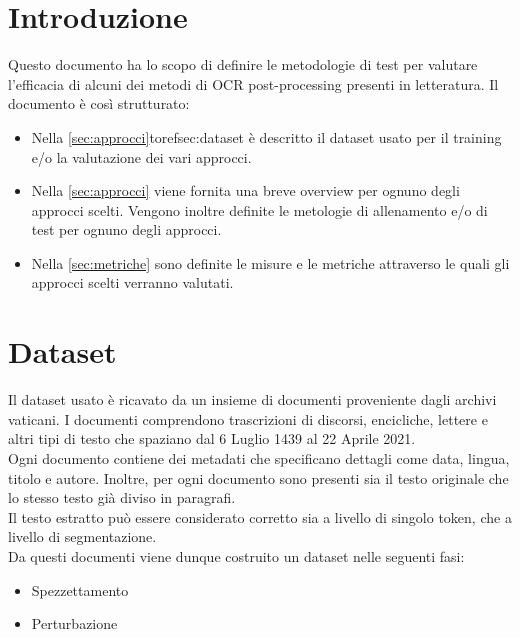 \documentclass[12pt]{article}
\begin{document}
\maketitle


\section{Introduzione}
Questo documento ha lo scopo di definire le metodologie di test per valutare l'efficacia di alcuni dei metodi di OCR post-processing presenti in letteratura. Il documento è così strutturato:
\begin{itemize}
\item Nella \autoref{sec:approcci}toref{sec:dataset} è descritto il dataset usato per il training e/o la valutazione dei vari approcci.
\item Nella \autoref{sec:approcci} viene fornita una breve overview per ognuno degli approcci scelti. Vengono inoltre definite le metologie di allenamento e/o di test per ognuno degli approcci.
\item Nella \autoref{sec:metriche} sono definite le misure e le metriche attraverso le quali gli approcci scelti verranno valutati.
\end{itemize}


\section{Dataset} \label{sec:dataset}
Il dataset usato è ricavato da un insieme di documenti proveniente dagli archivi vaticani. I documenti comprendono trascrizioni di discorsi, encicliche, lettere e altri tipi di testo che spaziano dal 6 Luglio 1439 al 22 Aprile 2021.\\
Ogni documento contiene dei metadati che specificano dettagli come data, lingua, titolo e autore. Inoltre, per ogni documento sono presenti sia il testo originale che lo stesso testo già diviso in paragrafi.\\
Il testo estratto può essere considerato corretto sia a livello di singolo token, che a livello di segmentazione. \\
Da questi documenti viene dunque costruito un dataset nelle seguenti fasi:
\begin{itemize}
\item Spezzettamento
\item Perturbazione
\end{itemize}
\end{document}
